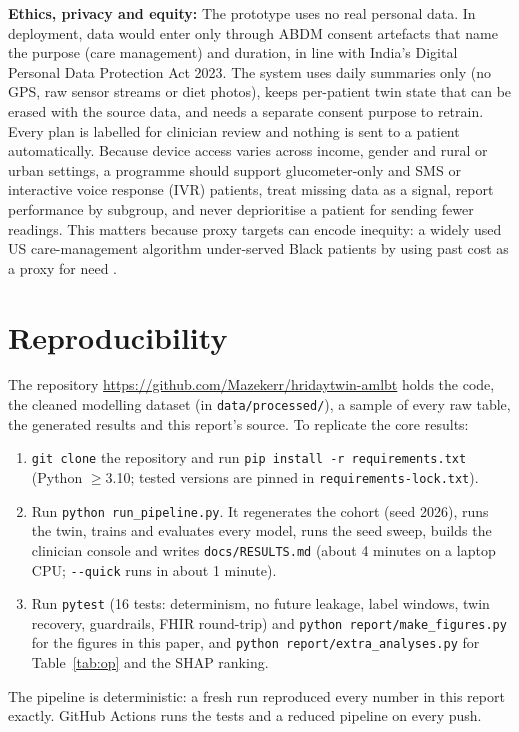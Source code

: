 \documentclass[conference]{IEEEtran}
\newcommand{\RepoURL}{https://github.com/Mazekerr/hridaytwin-amlbt}
\begin{document}
\textbf{Ethics, privacy and equity:} The prototype uses no real personal data. In deployment, data would enter only through ABDM consent artefacts that name the purpose (care management) and duration, in line with India's Digital Personal Data Protection Act 2023. The system uses daily summaries only (no GPS, raw sensor streams or diet photos), keeps per-patient twin state that can be erased with the source data, and needs a separate consent purpose to retrain. Every plan is labelled for clinician review and nothing is sent to a patient automatically. Because device access varies across income, gender and rural or urban settings, a programme should support glucometer-only and SMS or interactive voice response (IVR) patients, treat missing data as a signal, report performance by subgroup, and never deprioritise a patient for sending fewer readings. This matters because proxy targets can encode inequity: a widely used US care-management algorithm under-served Black patients by using past cost as a proxy for need \cite{obermeyer2019}.

\section{Reproducibility}
\label{sec:repro}
The repository \url{\RepoURL} holds the code, the cleaned modelling dataset (in \texttt{data/processed/}), a sample of every raw table, the generated results and this report's source. To replicate the core results:
\begin{enumerate}
\item \texttt{git clone} the repository and run \texttt{pip install -r requirements.txt} (Python $\ge$3.10; tested versions are pinned in \texttt{requirements-lock.txt}).
\item Run \texttt{python run\_pipeline.py}. It regenerates the cohort (seed 2026), runs the twin, trains and evaluates every model, runs the seed sweep, builds the clinician console and writes \texttt{docs/RESULTS.md} (about 4 minutes on a laptop CPU; \texttt{-{}-quick} runs in about 1 minute).
\item Run \texttt{pytest} (16 tests: determinism, no future leakage, label windows, twin recovery, guardrails, FHIR round-trip) and \texttt{python report/make\_figures.py} for the figures in this paper, and \texttt{python report/extra\_analyses.py} for Table~\ref{tab:op} and the SHAP ranking.
\end{enumerate}
The pipeline is deterministic: a fresh run reproduced every number in this report exactly. GitHub Actions runs the tests and a reduced pipeline on every push.
\end{document}
